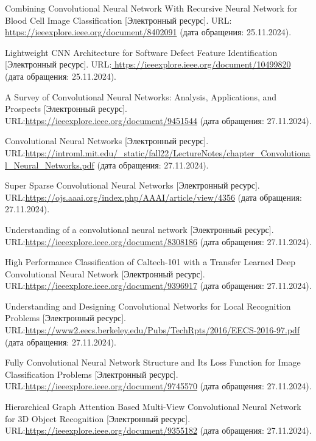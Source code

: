 
\renewcommand\bibname{СПИСОК ИСПОЛЬЗОВАННЫХ ИСТОЧНИКОВ}
\begin{thebibliography}{}
	
	\setlength\bibindent{1.25cm}
	\makeatletter
	\let\old@biblabel\@biblabel
	\def\@biblabel#1{\kern\bibindent\old@biblabel{#1}}
	\makeatother
	
	 Combining Convolutional Neural Network With Recursive Neural Network for Blood Cell Image Classification [Электронный ресурс]. URL: \url{https://ieeexplore.ieee.org/document/8402091} (дата обращения: 25.11.2024).
	
	 Lightweight CNN Architecture for Software Defect Feature Identification [Электронный ресурс]. URL:\url{ https://ieeexplore.ieee.org/document/10499820} (дата обращения: 25.11.2024).
	
	 A Survey of Convolutional Neural Networks: Analysis, Applications, and Prospects [Электронный ресурс]. URL:\url{https://ieeexplore.ieee.org/document/9451544} (дата обращения: 27.11.2024).
	
	 Convolutional Neural Networks [Электронный ресурс]. URL:\url{https://introml.mit.edu/_static/fall22/LectureNotes/chapter_Convolutional_Neural_Networks.pdf} (дата обращения: 27.11.2024).
	
	 Super Sparse Convolutional Neural Networks [Электронный ресурс]. URL:\url{https://ojs.aaai.org/index.php/AAAI/article/view/4356} (дата обращения: 27.11.2024).
	
	 Understanding of a convolutional neural network
	[Электронный ресурс]. URL:\url{https://ieeexplore.ieee.org/document/8308186} (дата обращения: 27.11.2024).
	
	 High Performance Classification of Caltech-101 with a Transfer Learned Deep Convolutional Neural Network
	[Электронный ресурс]. URL:\url{https://ieeexplore.ieee.org/document/9396917} (дата обращения: 27.11.2024).
	
	 Understanding and Designing Convolutional Networks for Local Recognition
	Problems [Электронный ресурс]. URL:\url{https://www2.eecs.berkeley.edu/Pubs/TechRpts/2016/EECS-2016-97.pdf} (дата обращения: 27.11.2024).
	
	 Fully Convolutional Neural Network Structure and Its Loss Function for Image Classification
	Problems [Электронный ресурс]. URL:\url{https://ieeexplore.ieee.org/document/9745570} (дата обращения: 27.11.2024).
	
	 Hierarchical Graph Attention Based Multi-View Convolutional Neural Network for 3D Object Recognition [Электронный ресурс]. URL:\url{https://ieeexplore.ieee.org/document/9355182} (дата обращения: 27.11.2024).
	
\end{thebibliography}